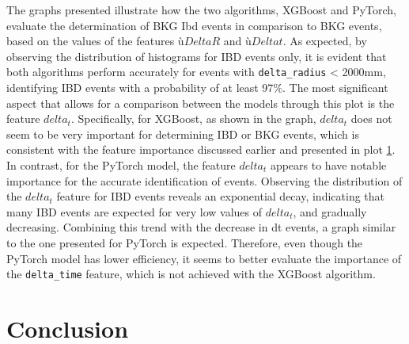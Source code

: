 The graphs presented illustrate how the two algorithms, XGBoost and PyTorch, evaluate the determination of BKG Ibd events in comparison to BKG events, based on the values of the features $ùDelta R$ and $ùDelta t$. As expected, by observing the distribution of histograms for IBD events only, it is evident that both algorithms perform accurately for events with \texttt{delta\_radius} < 2000mm, identifying IBD events with a probability of at least 97$\%$. The most significant aspect that allows for a comparison between the models through this plot is the feature $delta_t$. Specifically, for XGBoost, as shown in the graph, $delta_t$ does not seem to be very important for determining IBD or BKG events, which is consistent with the feature importance discussed earlier and presented in plot \ref{}. In contrast, for the PyTorch model, the feature $delta_t$ appears to have notable importance for the accurate identification of events. Observing the distribution of the $delta_t$ feature for IBD events reveals an exponential decay, indicating that many IBD events are expected for very low values of $delta_t$, and gradually decreasing. Combining this trend with the decrease in dt events, a graph similar to the one presented for PyTorch is expected. Therefore, even though the PyTorch model has lower efficiency, it seems to better evaluate the importance of the \texttt{delta\_time} feature, which is not achieved with the XGBoost algorithm.

\section{Conclusion}

